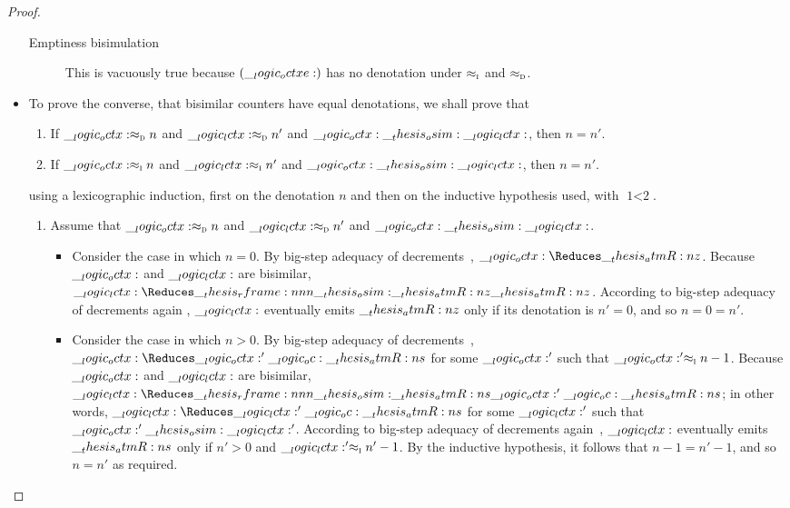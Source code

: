 \begin{proof}
\begin{itemize}
\begin{description}
  \item[Emptiness bisimulation]
    This is vacuously true because $(\__logic_octxe:)$ has no denotation under $ \approx\sb{\text{\normalfont\scshape i}} $ and $ \approx\sb{\text{\normalfont\scshape d}} $.
  \end{description}

  \item
    To prove the converse, that bisimilar counters have equal denotations, we shall prove that 
    \begin{enumerate}[noitemsep]
    \item If $\__logic_octx: \approx\sb{\text{\normalfont\scshape d}} n$ and $\__logic_lctx: \approx\sb{\text{\normalfont\scshape d}} n'$ and $\__logic_octx: \__thesis_osim: \__logic_lctx:$, then $n = n'$.\label{item:dec-hyp}
    \item If $\__logic_octx: \approx\sb{\text{\normalfont\scshape i}} n$ and $\__logic_lctx: \approx\sb{\text{\normalfont\scshape i}} n'$ and $\__logic_octx: \__thesis_osim: \__logic_lctx:$, then $n = n'$.
    \end{enumerate}
    using a lexicographic induction, first on the denotation $n$ and then on the inductive hypothesis used, with $\text{1} < \text{2}$.
  \begin{enumerate}
  \item Assume that $\__logic_octx: \approx\sb{\text{\normalfont\scshape d}} n$ and $\__logic_lctx: \approx\sb{\text{\normalfont\scshape d}} n'$ and $\__logic_octx: \__thesis_osim: \__logic_lctx:$.
    \begin{itemize}
    \item
      Consider the case in which $n = 0$.
      By big-step adequacy of decrements~, $\octx \Reduces \atmR{z}$.
      Because $\__logic_octx:$ and $\__logic_lctx:$ are bisimilar, $\lctx \Reduces\rframe{\osim}{\atmR{z}} \atmR{z}$.
      According to big-step adequacy of decrements again , $\__logic_lctx:$ eventually emits $\__thesis_atmR:n {z}$ only if its denotation is $n' = 0$, and so $n = 0 = n'$.

    \item 
      Consider the case in which $n > 0$.
      By big-step adequacy of decrements~, $\octx \Reduces \octx' \oc \atmR{s}$ for some $\__logic_octx:'$ such that $\__logic_octx:' \approx\sb{\text{\normalfont\scshape i}} n-1$.
      Because $\__logic_octx:$ and $\__logic_lctx:$ are bisimilar, $\lctx \Reduces\rframe{\osim}{\atmR{s}} \octx' \oc \atmR{s}$; in other words, $\lctx \Reduces \lctx' \oc \atmR{s}$ for some $\__logic_lctx:'$ such that $\__logic_octx:' \__thesis_osim: \__logic_lctx:'$.
      According to big-step adequacy of decrements again~, $\__logic_lctx:$ eventually emits $\__thesis_atmR:n {s}$ only if $n' > 0$ and $\__logic_lctx:' \approx\sb{\text{\normalfont\scshape i}} n'-1$.
      By the inductive hypothesis, it follows that $n-1 = n'-1$, and so $n = n'$ as required.
    \end{itemize}
    

\end{enumerate}
\end{itemize}
\end{proof}
